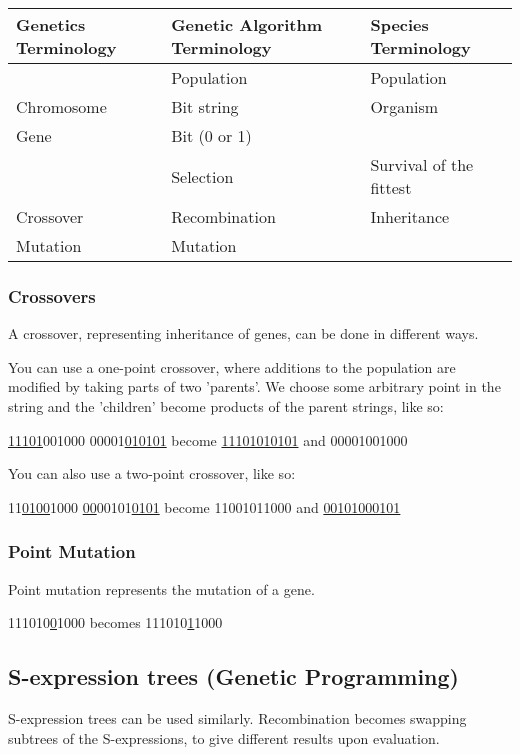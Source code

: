 \begin{tabular}{| l | l | l |}
    \hline
    Genetics Terminology & Genetic Algorithm Terminology & Species Terminology\\ \hline
                         & Population                    & Population\\ \hline
    Chromosome           & Bit string                    & Organism\\ \hline
    Gene                 & Bit (0 or 1)                  & \\ \hline
                         & Selection                     & Survival of the fittest\\ \hline
    Crossover            & Recombination                 & Inheritance\\ \hline
    Mutation             & Mutation                      & \\ \hline
\end{tabular}

\subsubsection{Crossovers}
A crossover, representing inheritance of genes, can be done in different ways.

You can use a one-point crossover, where additions to the population are
modified by taking parts of two 'parents'. We choose some arbitrary point in
the string and the 'children' become products of the parent strings, like so:

\underline{11101}001000 00001\underline{010101} become \underline{11101010101} and 00001001000

You can also use a two-point crossover, like so:

11\underline{0100}1000 \underline{00}00101\underline{0101} become 11001011000 and \underline{00101000101}

\subsubsection{Point Mutation}
Point mutation represents the mutation of a gene.

111010\underline{0}1000 becomes 111010\underline{1}1000

\subsection{S-expression trees (Genetic Programming)}
S-expression trees can be used similarly. Recombination becomes swapping
subtrees of the S-expressions, to give different results upon evaluation.

